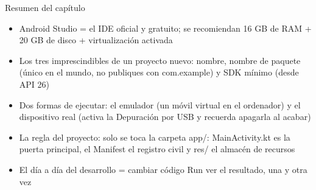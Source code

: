\begin{tcbsummary}{Resumen del capítulo}
\begin{itemize}
  \item Android Studio = el IDE oficial y gratuito; se recomiendan 16 GB de RAM + 20 GB de disco + virtualización activada
  \item Los tres imprescindibles de un proyecto nuevo: nombre, nombre de paquete (único en el mundo, no publiques con com.example) y SDK mínimo (desde API 26)
  \item Dos formas de ejecutar: el emulador (un móvil virtual en el ordenador) y el dispositivo real (activa la Depuración por USB y recuerda apagarla al acabar)
  \item La regla del proyecto: solo se toca la carpeta app/: MainActivity.kt es la puerta principal, el Manifest el registro civil y res/ el almacén de recursos
  \item El día a día del desarrollo = cambiar código Run ver el resultado, una y otra vez
\end{itemize}

\end{tcbsummary}
